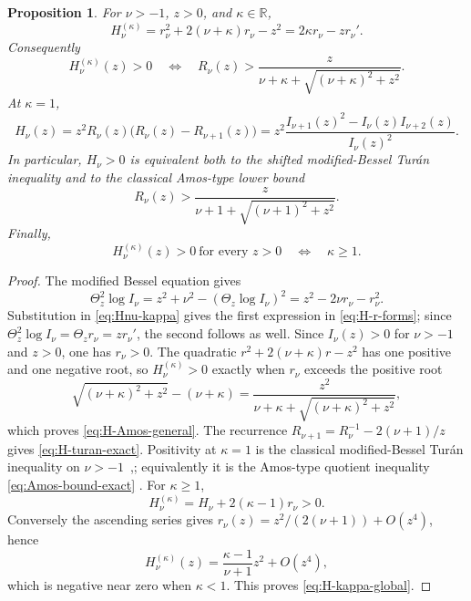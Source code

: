 \documentclass[11pt,a4paper]{amsart}
\numberwithin{equation}{section}
\theoremstyle{plain}
\newtheorem{proposition}[theorem]{Proposition}
\theoremstyle{definition}
\newcommand{\R}{\mathbb R}
\newcommand{\Thetaz}{\Theta_z}
\begin{document}
\begin{proposition}\label{prop:scalar-H}
For \(\nu>-1\), \(z>0\), and \(\kappa\in\R\),
\begin{equation}\label{eq:H-r-forms}
 H_\nu^{(\kappa)}
 =r_\nu^2+2(\nu+\kappa)r_\nu-z^2
 =2\kappa r_\nu-zr_\nu'.
\end{equation}
Consequently
\begin{equation}\label{eq:H-Amos-general}
 H_\nu^{(\kappa)}(z)>0
 \quad\Longleftrightarrow\quad
 R_\nu(z)>
 \frac{z}{\nu+\kappa+\sqrt{(\nu+\kappa)^2+z^2}}.
\end{equation}
At \(\kappa=1\),
\begin{equation}\label{eq:H-turan-exact}
 H_\nu(z)
 =z^2R_\nu(z)\bigl(R_\nu(z)-R_{\nu+1}(z)\bigr)
 =z^2\frac{I_{\nu+1}(z)^2-I_\nu(z)I_{\nu+2}(z)}{I_\nu(z)^2}.
\end{equation}
In particular, \(H_\nu>0\) is equivalent both to the shifted modified-Bessel
Tur\'an inequality and to the classical Amos-type lower bound
\begin{equation}\label{eq:Amos-bound-exact}
 R_\nu(z)>
 \frac{z}{\nu+1+\sqrt{(\nu+1)^2+z^2}}.
\end{equation}
Finally,
\begin{equation}\label{eq:H-kappa-global}
 H_\nu^{(\kappa)}(z)>0\ \text{for every }z>0
 \quad\Longleftrightarrow\quad
 \kappa\ge1.
\end{equation}
\end{proposition}

\begin{proof}
The modified Bessel equation \cite[eq.~10.25.1]{NISTDLMFBessel} gives
\[
 \Thetaz^2\log I_\nu
 =z^2+\nu^2-(\Thetaz\log I_\nu)^2
 =z^2-2\nu r_\nu-r_\nu^2.
\]
Substitution in \eqref{eq:Hnu-kappa} gives the first expression in
\eqref{eq:H-r-forms}; since
\(\Thetaz^2\log I_\nu=\Thetaz r_\nu=zr_\nu'\), the second follows as well.
Since \(I_\nu(z)>0\) for \(\nu>-1\) and \(z>0\), one has \(r_\nu>0\).  The
quadratic \(r^2+2(\nu+\kappa)r-z^2\) has one positive and one negative root, so
\(H_\nu^{(\kappa)}>0\) exactly when \(r_\nu\) exceeds the positive root
\[
 \sqrt{(\nu+\kappa)^2+z^2}-(\nu+\kappa)
 =\frac{z^2}{\nu+\kappa+\sqrt{(\nu+\kappa)^2+z^2}},
\]
which proves \eqref{eq:H-Amos-general}.  The recurrence
\(R_{\nu+1}=R_\nu^{-1}-2(\nu+1)/z\)
\cite[\S3.71]{Watson1944TreatiseBessel} gives \eqref{eq:H-turan-exact}.  Positivity at \(\kappa=1\) is the classical
modified-Bessel Tur\'an inequality on
\(\nu>-1\)~\cite[Thm.~2.1]{Baricz2010TuranBessel},\cite[\S1]{BariczPonnusamy2013TuranBessel};
equivalently it is
the Amos-type quotient inequality \eqref{eq:Amos-bound-exact}
\cite{Amos1974Ratios,HornikGrun2013Amos,Nasell1978Rational,Segura2011BoundsRatios}.
For \(\kappa\ge1\),
\[
 H_\nu^{(\kappa)}=H_\nu+2(\kappa-1)r_\nu>0.
\]
Conversely the ascending series gives
\(r_\nu(z)=z^2/(2(\nu+1))+O(z^4)\), hence
\[
 H_\nu^{(\kappa)}(z)
 =\frac{\kappa-1}{\nu+1}z^2+O(z^4),
\]
which is negative near zero when \(\kappa<1\).  This proves
\eqref{eq:H-kappa-global}.
\end{proof}
\end{document}
